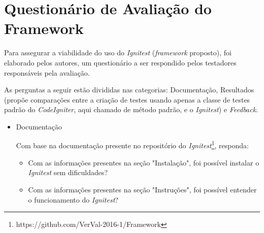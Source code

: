 \chapter{Questionário de Avaliação do Framework}

    Para assegurar a viabilidade do uso do \textit{Ignitest} (\textit{framework} proposto), foi elaborado pelos autores, um questionário a ser respondido pelos testadores responsáveis pela avaliação.
    
    As perguntas a seguir estão divididas nas categorias: Documentação, Resultados (propõe comparações entre a criação de testes usando apenas a classe de testes padrão do \textit{CodeIgniter}, aqui chamado de método padrão, e o \textit{Ignitest}) e \textit{Feedback}.
    
    \begin{itemize}
        \item Documentação
        
            Com base na documentação presente no repositório do \textit{Ignitest}\footnote{https://github.com/VerVal-2016-1/Framework}, responda:
            \begin{itemize}
                \item Com as informações presentes na seção "Instalação", foi possível instalar o \textit{Ignitest} sem dificuldades?
                \item Com as informações presentes na seção "Instruções", foi possível entender o funcionamento do \textit{Ignitest}?
            \end{itemize}
            

\end{itemize}
